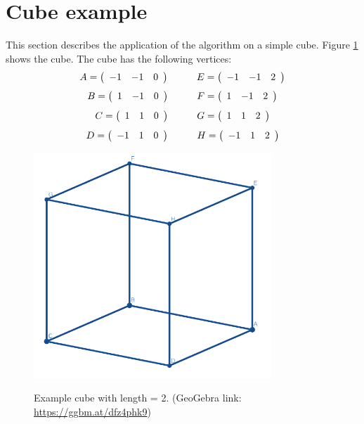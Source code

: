 \documentclass{article}
\begin{document}
\section{Cube example}
This section describes the application of the algorithm on a simple cube. Figure \ref{fig:cube} shows the cube. The cube has the following vertices:
\[A = \left({\begin{array}{ccc} -1 & -1 & 0 \end{array}}\right) \hspace{10mm} E = \left({\begin{array}{ccc} -1 & -1 & 2 \end{array}}\right) \]
\[B = \left({\begin{array}{ccc} 1  & -1 & 0 \end{array}}\right) \hspace{10mm} F = \left({\begin{array}{ccc}  1 & -1 & 2 \end{array}}\right) \]
\[C = \left({\begin{array}{ccc} 1  &  1 & 0 \end{array}}\right) \hspace{10mm} G = \left({\begin{array}{ccc}  1 &  1 & 2 \end{array}}\right) \]
\[D = \left({\begin{array}{ccc} -1 &  1 & 0 \end{array}}\right) \hspace{10mm} H = \left({\begin{array}{ccc} -1 &  1 & 2 \end{array}}\right) \]
\begin{figure}[H]
\caption{Example cube with length = 2. (GeoGebra link: \href{https://ggbm.at/dfz4phk9}{https://ggbm.at/dfz4phk9})}
\centering
\includegraphics[width=0.8\textwidth]{images/cl-01.png}
\label{fig:cube}
\end{figure}
\end{document}

